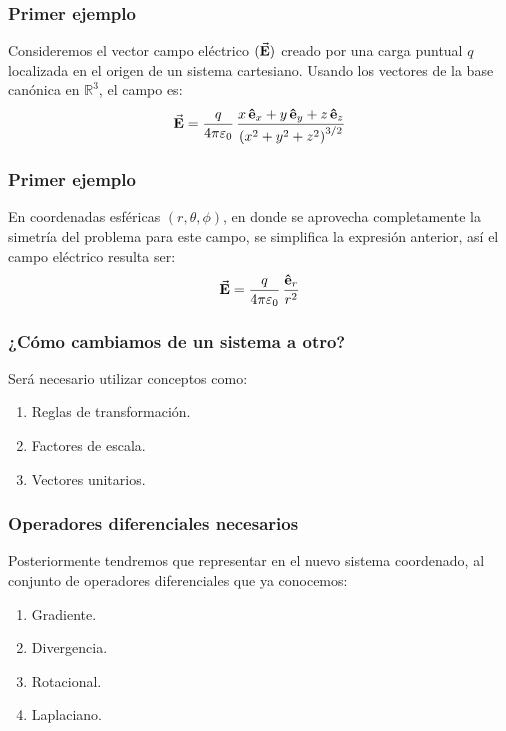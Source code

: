 \documentclass[12pt]{beamer}
\begin{document}
\begin{frame}
\frametitle{Primer ejemplo}
Consideremos el vector campo eléctrico $(\va{E})$ creado por una carga puntual $q$ localizada en el origen de un sistema cartesiano. \pause Usando los vectores de la base canónica en $\mathbb{R}^{3}$, el campo es:
\pause
\begin{align*}
\va{E} = \dfrac{q}{4 \pi \varepsilon_{0}} \, \dfrac{x \, \vu{e}_{x} + y \, \vu{e}_{y} + z \, \vu{e}_{z}}{\left( x^{2} + y^{2} + z^{2} \right)^{3/2}}
\end{align*}
\end{frame}
\begin{frame}
\frametitle{Primer ejemplo}
En coordenadas esféricas $(r, \theta, \phi)$, en donde se aprovecha completamente la simetría del problema para este campo, se simplifica la expresión anterior, \pause así el campo eléctrico resulta ser:
\begin{align*}
\va{\vb{E}} = \dfrac{q}{4 \pi \varepsilon_{0}} \, \dfrac{\vu{e}_{r}}{r^{2}}
\end{align*}
\end{frame}
\begin{frame}
\frametitle{¿Cómo cambiamos de un sistema a otro?}
Será necesario utilizar conceptos como:
\pause
{}
\begin{enumerate}[<+->]
\item Reglas de transformación.
\item Factores de escala.
\item Vectores unitarios.
\end{enumerate}
\end{frame}
\begin{frame}
\frametitle{Operadores diferenciales necesarios}
Posteriormente tendremos que representar en el nuevo sistema coordenado, al conjunto de operadores diferenciales que ya conocemos:
\pause
{}
\begin{enumerate}[<+->]
\item Gradiente.
\item Divergencia.
\item Rotacional.
\item Laplaciano.
\end{enumerate}
\end{frame}
\end{document}
